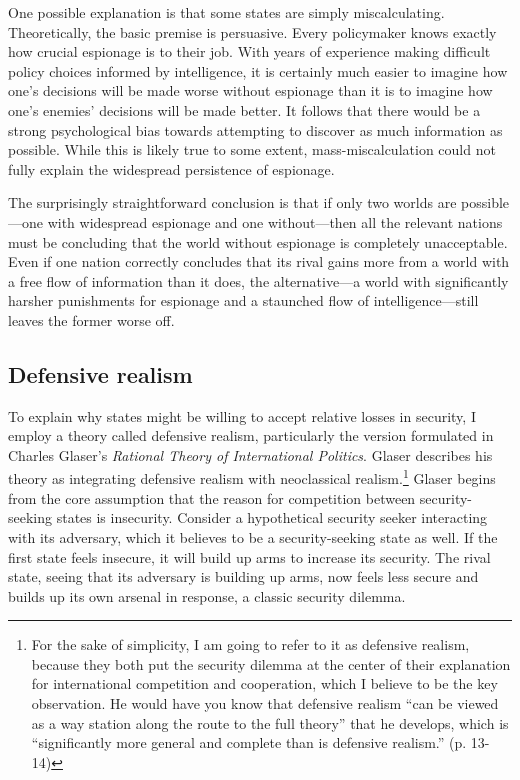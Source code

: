 \documentclass[14pt]{extarticle}
\begin{document}

One possible explanation is that some states are simply miscalculating. Theoretically, the basic premise is persuasive. Every policymaker knows exactly how crucial espionage is to their job. With years of experience making difficult policy choices informed by intelligence, it is certainly much easier to imagine how one's decisions will be made worse without espionage than it is to imagine how one's enemies' decisions will be made better. It follows that there would be a strong psychological bias towards attempting to discover as much information as possible. While this is likely true to some extent, mass-miscalculation could not fully explain the widespread persistence of espionage.

The surprisingly straightforward conclusion is that if only two worlds are possible---one with widespread espionage and one without---then all the relevant nations must be concluding that the world without espionage is completely unacceptable. Even if one nation correctly concludes that its rival gains more from a world with a free flow of information than it does, the alternative---a world with significantly harsher punishments for espionage and a staunched flow of intelligence---still leaves the former worse off.

\subsection{Defensive realism}
To explain why states might be willing to accept relative losses in security, I employ a theory called defensive realism, particularly the version formulated in Charles Glaser's \emph{Rational Theory of International Politics}. Glaser describes his theory as integrating defensive realism with neoclassical realism.\footnote{For the sake of simplicity, I am going to refer to it as defensive realism, because they both put the security dilemma at the center of their explanation for international competition and cooperation, which I believe to be the key observation. He would have you know that defensive realism \enquote{can be viewed as a way station along the route to the full theory} that he develops, which is \enquote{significantly more general and complete than is defensive realism.} (p. 13-14)} Glaser begins from the core assumption that the reason for competition between security-seeking states is insecurity. Consider a hypothetical security seeker interacting with its adversary, which it believes to be a security-seeking state as well. If the first state feels insecure, it will build up arms to increase its security. The rival state, seeing that its adversary is building up arms, now feels less secure and builds up its own arsenal in response, a classic security dilemma.
\end{document}
